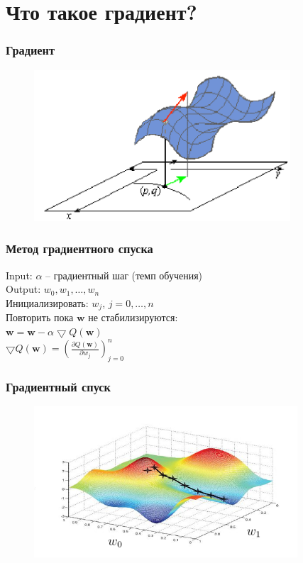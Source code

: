 \documentclass[10pt]{beamer}
\begin{document}
\section{Что такое градиент?}

\begin{frame}\frametitle{Градиент}
	\begin{figure}[htbp]
	  \includegraphics[height=160pt, keepaspectratio = true]{images/gradient}
	\end{figure}
\end{frame}

\begin{frame}\frametitle{Метод градиентного спуска}
	Input: $\alpha$ -- градиентный шаг (темп обучения)\\
	Output: $w_0, w_1, \dots, w_n$\\
	\vspace{3mm}
	Инициализировать: $w_j$, $j=0,\dots, n$\\
	Повторить пока $\mathbf{w}$ не стабилизируются:\\
	\hspace{10mm} $\mathbf{w} =  \mathbf{w} - \alpha \bigtriangledown Q(\mathbf{w})$\\
	
	\vspace{10mm}
	$\bigtriangledown Q(\mathbf{w}) = (\frac{\partial Q(\mathbf{w})}{\partial w_j})_{j=0}^n$\\
\end{frame}

\begin{frame}\frametitle{Градиентный спуск}
	\begin{figure}[htbp]
	  \includegraphics[height=160pt, keepaspectratio = true]{images/gradient_descent}
	\end{figure}
\end{frame}
\end{document}
